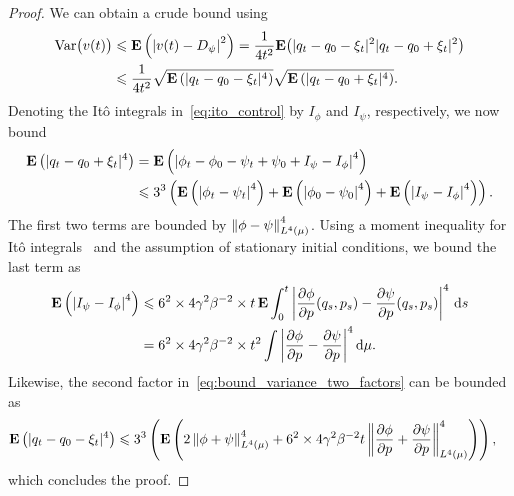 \documentclass[11pt,a4paper]{article}
\newcommand{\expect}[0]{\mathbf{E}}
\renewcommand{\d}{\mathrm d}
\theoremstyle{plain}
\newtheorem{remark}{Remark}[section]
\numberwithin{equation}{section}
\renewcommand{\leq}{\leqslant}
\begin{document}

\begin{proof}
    We can obtain a crude bound using
    \begin{align}
        \notag
        \mathrm{Var} \bigl(v(t)\bigr)
        &\leq \expect \left( \abs{v(t) - D_{\psi}}^2 \right)
        = \frac{1}{4 t^2} \expect \big( |q_t - q_0 - \xi_t|^2 |q_t - q_0 + \xi_t|^2 \big) \\
        \label{eq:bound_variance_two_factors}
        &\leq \frac{1}{4 t^2} \sqrt{\expect \left(  |q_t - q_0 - \xi_t|^4 \right)} \sqrt{\expect \left( |q_t - q_0 + \xi_t|^4 \right)}.
    \end{align}
    Denoting the It\^o integrals in~\eqref{eq:ito_control} by $I_{\phi}$ and $I_{\psi}$,
    respectively, we now bound
    \begin{align*}
        \expect \left( |q_t - q_0 + \xi_t|^4 \right)
    &= \expect \left( \abs{\phi_t - \phi_0 - \psi_t + \psi_0 + I_{\psi} - I_{\phi}}^4 \right) \\
    &\leq 3^3 \left( \expect \left( \abs{\phi_t - \psi_t}^4 \right) + \expect \left( \abs{\phi_0 - \psi_0}^4 \right) + \expect \left( \abs{I_{\psi} - I_{\phi}}^4 \right) \right).
    \end{align*}
    The first two terms are bounded by $\norm{\phi - \psi}_{L^4(\mu)}^4$.
    Using a moment inequality for It\^o integrals~\cite[Theorem 7.1]{MR2380366}
    and the assumption of stationary initial conditions,
    we bound the last term as
    \begin{align*}
        \expect \left( \abs{I_{\psi} - I_{\phi}}^4 \right)
        &\leq 6^2 \times 4 \gamma^2 \beta^{-2} \times  t \, \expect \int_{0}^{t} \abs{\derivative{1}[\phi]{p}(q_s, p_s) - \derivative{1}[\psi]{p}(q_s, p_s)}^4 \, \d s \\
        &= 6^2 \times  4 \gamma^2 \beta^{-2} \times t^2 \int \abs{\derivative{1}[\phi]{p} - \derivative{1}[\psi]{p}}^4 \d \mu.
    \end{align*}
    Likewise, the second factor in~\eqref{eq:bound_variance_two_factors} can be bounded as
    \begin{align*}
        \expect \left( |q_t - q_0 - \xi_t|^4 \right)
    &\leq 3^3 \left( \expect \left( 2 \norm{\phi + \psi}[L^4(\mu)]^4 + 6^2 \times 4 \gamma^2 \beta^{-2} t \norm{\derivative{1}[\phi]{p} + \derivative{1}[\psi]{p}}[L^{4}(\mu)]^4 \right) \right),
    \end{align*}
    which concludes the proof.
\end{proof}
\end{document}
